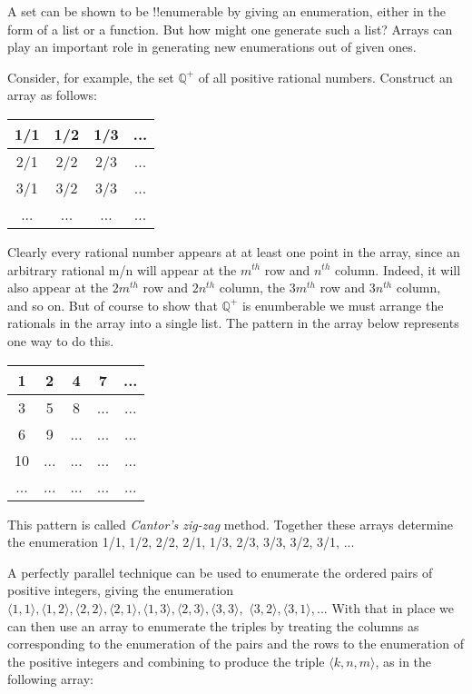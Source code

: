 \documentclass[../../../include/open-logic-section]{subfiles}
\begin{document}

A set can be shown to be !!{enumerable} by giving an enumeration, either in
the form of a list or a function. But how might one generate such a list?
Arrays can play an important role in generating new enumerations out of
given ones.

Consider, for example, the set $\mathbb{Q}^{+}$ of all positive rational
numbers. Construct an array as follows:

\begin{tabular}{c|c|c|c} 
1/1 & 1/2 & 1/3 & ... \\\hline
2/1 & 2/2 & 2/3 & ... \\\hline
3/1 & 3/2 & 3/3 & ... \\\hline
... & ... & ... & ... \\
\end{tabular}

Clearly every rational number appears at at least one point in the array,
since an arbitrary rational m/n will appear at the $m^{th}$ row and $n^{th}$
column. Indeed, it will also appear at the $2m^{th}$ row and $2n^{th}$ column,
the $3m^{th}$ row and $3n^{th}$ column, and so on. But of course to show that
$\mathbb{Q}^{+}$ is enumberable we must arrange the rationals in the array
into a single list. The pattern in the array below represents one way to do
this.

\begin{tabular}{c|c|c|c|c} 
1 & 2 & 4 & 7 &  ... \\\hline
3 & 5 & 8 &  ...& ... \\\hline
6 & 9 &  ... & ... & ... \\\hline
10&  ... & ...& ... & ... \\\hline
... & ... & ... & ... & ...\\
\end{tabular}

This pattern is called \emph{Cantor's zig-zag} method. Together these
arrays determine the enumeration 1/1, 1/2, 2/2, 2/1, 1/3, 2/3, 3/3, 3/2,
3/1, ...

A perfectly parallel technique can be used to enumerate the ordered pairs
of positive integers, giving the enumeration $\langle1,1\rangle,
\langle1,2\rangle, \langle2,2\rangle, \langle2,1\rangle, \langle1,3\rangle,
\langle2,3\rangle, \langle3,3\rangle,$ $\langle3,2\rangle,
\langle3,1\rangle, ...$ With that in place we can then use an array to
enumerate the triples by treating the columns as corresponding to the
enumeration of the pairs and the rows to the enumeration of the positive
integers and combining to produce the triple $\langle k,n,m\rangle$, as in
the following array:
\end{document}
